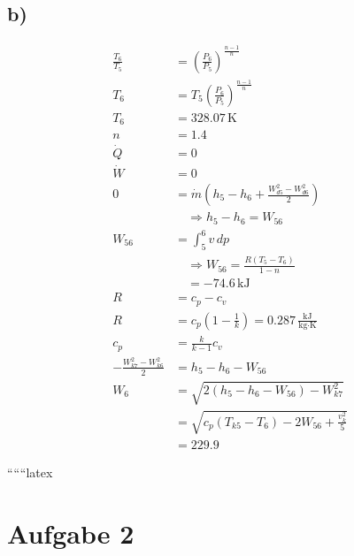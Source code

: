 

\subsection*{b)}

\begin{align*}
\frac{T_6}{T_5} &= \left( \frac{P_6}{P_5} \right)^{\frac{n-1}{n}} \\
T_6 &= T_5 \left( \frac{P_6}{P_5} \right)^{\frac{n-1}{n}} \\
T_6 &= 328.07 \, \text{K} \\
n &= 1.4 \\
\dot{Q} &= 0 \\
\dot{W} &= 0 \\
0 &= \dot{m} \left( h_5 - h_6 + \frac{W_{d5}^2 - W_{d6}^2}{2} \right) \\
&\quad \Rightarrow h_5 - h_6 = W_{56} \\
W_{56} &= \int_{5}^{6} v \, dp \\
&\quad \Rightarrow W_{56} = \frac{R(T_5 - T_6)}{1 - n} \\
&\quad = -74.6 \, \text{kJ} \\
R &= c_p - c_v \\
R &= c_p \left( 1 - \frac{1}{k} \right) = 0.287 \, \frac{\text{kJ}}{\text{kg} \cdot \text{K}} \\
c_p &= \frac{k}{k-1} c_v \\
-\frac{W_{k7}^2 - W_{k6}^2}{2} &= h_5 - h_6 - W_{56} \\
W_6 &= \sqrt{2(h_5 - h_6 - W_{56}) - W_{k7}^2} \\
&= \sqrt{c_p (T_{k5} - T_6) - 2 W_{56} + \frac{v_k^2}{5}} \\
&= 229.9
\end{align*}

``````latex


\section*{Aufgabe 2}